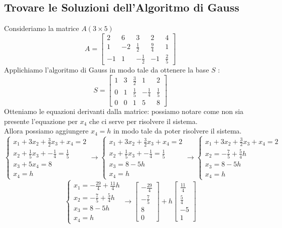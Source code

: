 \documentclass[a4paper, 10pt]{article}
\begin{document}
	\subsection{Trovare le Soluzioni dell'Algoritmo di Gauss}
	Consideriamo la matrice $A (3 \times 5)$
	\[
	A=
		\begin{bmatrix}
			2 & 6 & 3 & 2 & 4 \\
			1 & -2 & \frac{1}{2} & \frac{9}{4} & 1 \\
			-1 & 1 & -\frac{1}{2} & -1 & \frac{2}{5}
		\end{bmatrix}
	\]
	Applichiamo l'algoritmo di Gauss in modo tale da ottenere la base $S$ :
	\[
	S=
		\begin{bmatrix}
			1 & 3 & \frac{3}{2} & 1 & 2 \\
			0 & 1 & \frac{1}{5} & -\frac{1}{4} & \frac{1}{5} \\
			0 & 0 & 1 & 5 & 8
		\end{bmatrix}
	\]
	Otteniamo le equazioni derivanti dalla matrice: possiamo notare come non sia presente 
	l'equazione per $x_4$  che ci serve per risolvere il sistema. \\Allora possiamo aggiungere $x_4 = h$ in modo
	tale da poter risolvere il sistema.
	\[
	\begin{cases}
		x_1 + 3x_2 + \frac{3}{2}x_3 + x_4 = 2 \\
		x_2 + \frac{1}{5}x_3 + -\frac{1}{4} = \frac{1}{5} \\
		x_3 + 5x_4 = 8 \\
		x_4 = h
	\end{cases} \rightarrow
	\begin{cases}
		x_1 + 3x_2 + \frac{3}{2}x_3 + x_4 = 2 \\
		x_2 + \frac{1}{5}x_3 + -\frac{1}{4} = \frac{1}{5} \\
		x_3 = 8 - 5h \\
		x_4 = h
	\end{cases} \rightarrow
	\begin{cases}
		x_1 + 3x_2 + \frac{3}{2}x_3 + x_4 = 2 \\
		x_2 = -\frac{7}{5} + \frac{5}{4}h\\
		x_3 = 8 - 5h \\
		x_4 = h
	\end{cases} 
	\]
	\[
	\begin{cases}
		x_1  = -\frac{29}{4} + \frac{11}{4}h \\
		x_2 = -\frac{7}{5} + \frac{5}{4}h\\
		x_3 = 8 - 5h \\
		x_4 = h
	\end{cases} \longrightarrow
	\begin{bmatrix}
			-\frac{29}{4} \\ -\frac{7}{5} \\ 8 \\ 0
		\end{bmatrix}
		+h
		\begin{bmatrix}
			\frac{11}{4} \\ \frac{5}{4} \\ -5 \\ 1
		\end{bmatrix}
	\]
\end{document}
